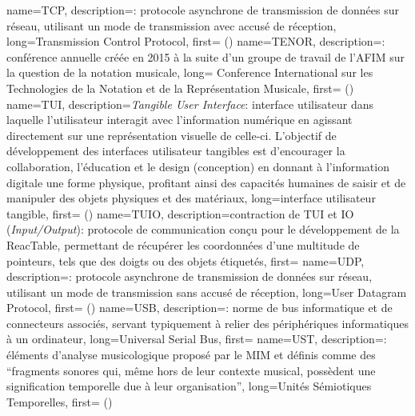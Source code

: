 {
    name={TCP},
    description={\textit{}: protocole asynchrone de transmission de données sur réseau, utilisant un mode de transmission avec accusé de réception},
    long={Transmission Control Protocol},
    first={ ()}
}
{
    name={TENOR},
    description={\textit{}: conférence annuelle créée en 2015 à la suite d'un groupe de travail de l'\gls{AFIM} sur la question de la notation musicale},
    long= {Conference International sur les Technologies de la Notation et de la Représentation Musicale},
    first={ ()}
}
{
    name={TUI},
    description={\textit{Tangible User Interface}: interface utilisateur dans laquelle l'utilisateur interagit avec l'information numérique en agissant directement sur une représentation visuelle de celle-ci. L'objectif de développement des interfaces utilisateur tangibles est d'encourager la collaboration, l'éducation et le design (conception) en donnant à l'information digitale une forme physique, profitant ainsi des capacités humaines de saisir et de manipuler des objets physiques et des matériaux},
    long={interface utilisateur tangible},
    first={ ()}
}
{
    name={TUIO},
    description={contraction de \gls{TUI} et IO (\textit{Input/Output}): protocole de communication conçu pour le développement de la ReacTable, permettant de récupérer les coordonnées d'une multitude de pointeurs, tels que des doigts ou des objets étiquetés},
    first={}
}
{
    name={UDP},
    description={\textit{}: protocole asynchrone de transmission de données sur réseau, utilisant un mode de transmission sans accusé de réception},
    long={User Datagram Protocol},
    first={ ()}
}
{
    name={USB},
    description={\textit{}: norme de bus informatique et de connecteurs associés, servant typiquement à relier des périphériques informatiques à un ordinateur},
    long={Universal Serial Bus},
    first={}
}
{
    name={UST},
    description={\textit{}: éléments d'analyse musicologique proposé par le \gls{MIM} et définis comme des ``fragments sonores qui, même hors de leur contexte musical, possèdent une signification temporelle due à leur organisation''},
    long={Unités Sémiotiques Temporelles},
    first={ ()}
}
